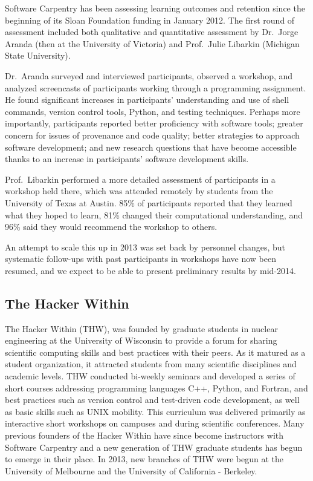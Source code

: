 \documentclass{proposalnsf}
\newlength{\up}
\begin{document}
Software Carpentry has been assessing learning outcomes and retention
since the beginning of its Sloan Foundation funding in January 2012.
The first round of assessment included both qualitative and
quantitative assessment by Dr.\ Jorge Aranda (then at the University
of Victoria) and Prof.\ Julie Libarkin (Michigan State University).

Dr.\ Aranda surveyed and interviewed participants, observed a
workshop, and analyzed screencasts of participants working through a
programming assignment. He found significant increases in
participants' understanding and use of shell commands, version control
tools, Python, and testing techniques. Perhaps more importantly,
participants reported better proficiency with software tools; greater
concern for issues of provenance and code quality; better strategies
to approach software development; and new research questions that have
become accessible thanks to an increase in participants' software
development skills.

Prof.\ Libarkin performed a more detailed assessment of participants
in a workshop held there, which was attended remotely by students from
the University of Texas at Austin. 85\% of participants reported that
they learned what they hoped to learn, 81\% changed their
computational understanding, and 96\% said they would recommend the
workshop to others.

An attempt to scale this up in 2013 was set back by personnel changes,
but systematic follow-ups with past participants in workshops have now
been resumed, and we expect to be able to present preliminary results
by mid-2014.

\subsection{The Hacker Within}

The Hacker Within (THW)\cite{huff2011}, was founded by graduate students in 
nuclear engineering at the University of Wisconsin to provide a forum for 
sharing scientific computing skills and best practices with their peers. As it 
matured as a student organization, it attracted students from many scientific 
disciplines and academic levels. THW conducted bi-weekly seminars and developed 
a series of short courses addressing programming languages C++, Python, and 
Fortran, and best practices such as version control and test-driven code 
development, as well as basic skills such as UNIX mobility. This curriculum was 
delivered primarily as interactive short workshops on campuses and during 
scientific conferences. Many previous founders of the Hacker Within have since 
become instructors with Software Carpentry and a new generation of THW graduate 
students has begun to emerge in their place. In 2013, new branches of THW were 
begun at the University of Melbourne and the University of California - 
Berkeley.  
\end{document}
